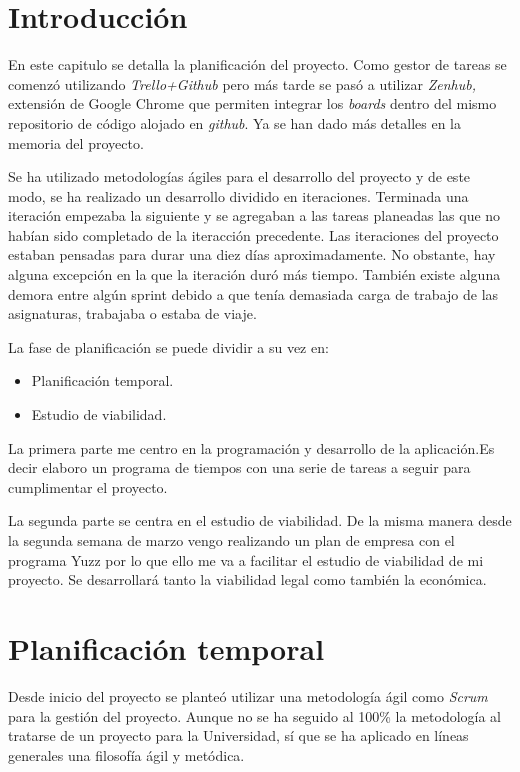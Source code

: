 
\section{Introducción}\label{introduccion-plan}
En este capitulo se detalla la planificación del proyecto. Como gestor de tareas se comenzó utilizando \emph{Trello+Github} pero más tarde se pasó a utilizar \emph{Zenhub,} extensión de Google Chrome que permiten integrar los \emph{boards} dentro del mismo repositorio de código alojado en \emph{github}. Ya se han dado más detalles en la memoria del proyecto.

Se ha utilizado metodologías ágiles para el desarrollo del proyecto y de este modo, se ha realizado un desarrollo dividido en iteraciones. Terminada una iteración empezaba la siguiente y se agregaban a las tareas planeadas las que no habían sido completado de la iteracción precedente. Las iteraciones del proyecto estaban pensadas para durar una diez días aproximadamente. No obstante, hay alguna excepción en la que la iteración duró más tiempo. También existe alguna demora entre algún sprint debido a que tenía demasiada carga de trabajo de las asignaturas, trabajaba o estaba de viaje. 

La fase de planificación se puede dividir a su vez en:

\begin{itemize}
\tightlist
\item
  Planificación temporal.
\item
  Estudio de viabilidad.
\end{itemize} 

La primera parte me centro en la programación y desarrollo de la aplicación.Es decir elaboro un programa de tiempos con una serie de tareas a seguir para cumplimentar el proyecto.

La segunda parte se centra en el estudio de viabilidad. De la misma manera desde la segunda semana de marzo vengo realizando un plan de empresa con el programa Yuzz por lo que ello me va a facilitar el estudio de viabilidad de mi proyecto. Se desarrollará tanto la viabilidad legal como también la económica. 


\section{Planificación temporal}\label{planificacion-temporal}
Desde inicio del proyecto se planteó utilizar una metodología ágil como
\emph{Scrum} para la gestión del proyecto. Aunque no se ha seguido al 100\% la
metodología al tratarse de un proyecto para la Universidad, sí que se ha aplicado
en líneas generales una filosofía ágil y metódica.


